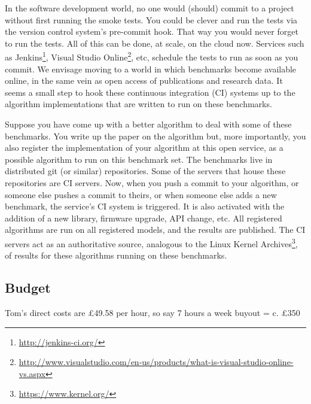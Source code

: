 \documentclass[a4paper,11pt]{article}
\begin{document}


In the software development world, no one would (should) commit to a
project without first running the smoke tests. You could be clever and
run the tests via the version control system's pre-commit hook. That
way you would never forget to run the tests. All of this can be done,
at scale, on the cloud now. Services such as
Jenkins\footnote{\url{http://jenkins-ci.org/}}, Visual Studio
Online\footnote{\url{http://www.visualstudio.com/en-us/products/what-is-visual-studio-online-vs.aspx}},
etc, schedule the tests to run as soon as you commit. We envisage
moving to a world in which benchmarks become available online, in the
same vein as open access of publications and research data. It seems a
small step to hook these continuous integration (CI) systems up to the
algorithm implementations that are written to run on these benchmarks.

Suppose you have come up with a better algorithm to deal with some of
these benchmarks. You write up the paper on the algorithm but, more
importantly, you also register the implementation of your algorithm at
this open service, as a possible algorithm to run on this benchmark
set. The benchmarks live in distributed git (or similar)
repositories. Some of the servers that house these repositories are CI
servers. Now, when you push a commit to your algorithm, or someone
else pushes a commit to theirs, or when someone else adds a new
benchmark, the service's CI system is triggered. It is also activated
with the addition of a new library, firmware upgrade, API change,
etc. All registered algorithms are run on all registered models, and
the results are published. The CI servers act as an authoritative
source, analogous to the Linux Kernel
Archives\footnote{\url{https://www.kernel.org/}}, of results for these
algorithms running on these benchmarks.



\subsection*{Budget}

Tom's direct costs are \pounds 49.58 per hour, so say 7 hours a week
buyout = c. \pounds 350
\end{document}
